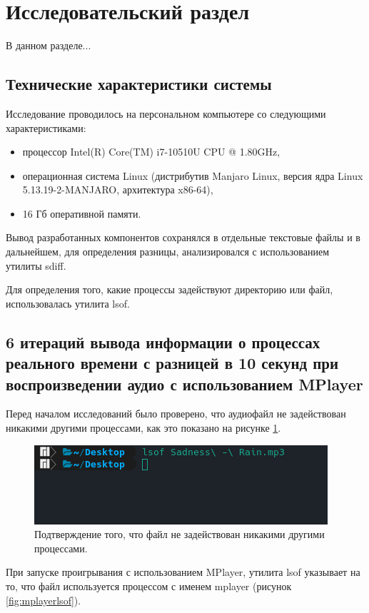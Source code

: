 \section{Исследовательский раздел} 
В данном разделе...

\subsection{Технические характеристики системы}
Исследование проводилось на персональном компьютере со следующими характеристиками:

\begin{itemize}
\item процессор Intel(R) Core(TM) i7-10510U CPU @ 1.80GHz,
\item операционная система Linux (дистрибутив Manjaro Linux, версия ядра Linux 5.13.19-2-MANJARO, архитектура x86-64),
\item 16 Гб оперативной памяти.
\end{itemize}

Вывод разработанных компонентов сохранялся в отдельные текстовые файлы и в дальнейшем, для определения разницы, анализировался с использованием утилиты sdiff.

Для определения того, какие процессы задействуют директорию или файл, использовалась утилита lsof.

\subsection{6 итераций вывода информации о процессах реального времени с разницей в 10 секунд при воспроизведении аудио с использованием MPlayer}
Перед началом исследований было проверено, что аудиофайл не задействован никакими другими процессами, как это показано на рисунке \ref{fig:emptylsof}.

\begin{figure}[H]
	\centering
	\includegraphics[scale=1]{img/emptylsof.png}
	\caption{Подтверждение того, что файл не задействован никакими другими процессами.}
	\label{fig:emptylsof}
\end{figure}

При запуске проигрывания с использованием MPlayer, утилита lsof указывает на то, что файл используется процессом с именем mplayer (рисунок \ref{fig:mplayerlsof}).

